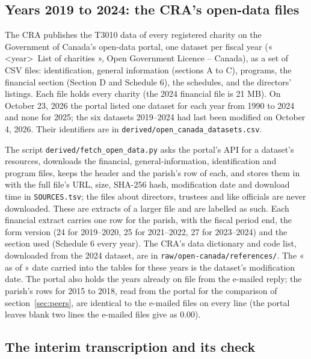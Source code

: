 \documentclass[11pt,letterpaper]{article}
\begin{document}
\subsection{Years 2019 to 2024: the CRA's open-data files}\label{sec:open}

The CRA publishes the T3010 data of every registered charity on the Government of Canada's open-data portal, one dataset per fiscal year (« \textless year\textgreater\ List of charities », Open Government Licence -- Canada), as a set of CSV files: identification, general information (sections A to C), programs, the financial section (Section D and Schedule 6), the schedules, and the directors' listings. Each file holds every charity (the 2024 financial file is 21 MB). On October 23, 2026 the portal listed one dataset for each year from 1990 to 2024 and none for 2025; the six datasets 2019--2024 had last been modified on October 4, 2026. Their identifiers are in \texttt{derived/open\_canada\_datasets.csv}.

The script \texttt{derived/fetch\_open\_data.py} asks the portal's API for a dataset's resources, downloads the financial, general-information, identification and program files, keeps the header and the parish's row of each, and stores them in  with the full file's URL, size, SHA-256 hash, modification date and download time in \texttt{SOURCES.tsv}; the files about directors, trustees and like officials are never downloaded. These are extracts of a larger file and are labelled as such. Each financial extract carries one row for the parish, with the fiscal period end, the form version (24 for 2019--2020, 25 for 2021--2022, 27 for 2023--2024) and the section used (Schedule 6 every year). The CRA's data dictionary and code list, downloaded from the 2024 dataset, are in \texttt{raw/open-canada/references/}. The « as of » date carried into the tables for these years is the dataset's modification date. The portal also holds the years already on file from the e-mailed reply; the parish's rows for 2015 to 2018, read from the portal for the comparison of section~\ref{sec:peers}, are identical to the e-mailed files on every line (the portal leaves blank two lines the e-mailed files give as 0.00).

\subsection{The interim transcription and its check}\label{sec:interim}
\end{document}
